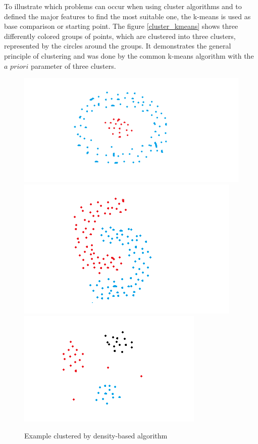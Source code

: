 \documentclass[a4paper,12pt]{report}
\begin{document}
To illustrate which problems can occur when using cluster algorithms and to defined the major features to find the most suitable one, the k-means is used as base comparison or starting point. The figure \ref{cluster_kmeans} shows three differently colored groups of points, which are clustered into three clusters, represented by the circles around the groups. It demonstrates the general principle of clustering and was done by the common k-means algorithm with the $a$ $priori$ parameter of three clusters. 

\begin{figure}[h]
	\centering
	\includegraphics[scale=0.4]{./assets/cluster_1.png}
	\includegraphics[scale=0.4]{./assets/cluster_2.png}
	\includegraphics[scale=0.4]{./assets/cluster_3.png}
	\caption{Example clustered by density-based algorithm \cite{Yildirim2020}}
	\label{cluster_dbscan}
\end{figure}
\end{document}
